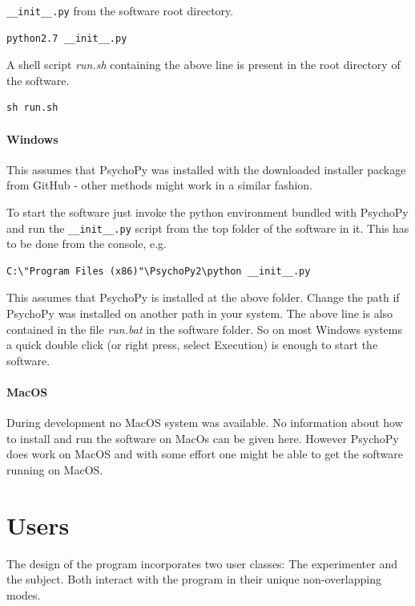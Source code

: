 \documentclass[12pt,a4paper]{book}
\begin{document}
\verb|__init__.py| from the software root directory.

\begin{verbatim}
python2.7 __init__.py
\end{verbatim}

A shell script \textit{run.sh} containing the above line is present in the root directory of the software.

\begin{verbatim}
sh run.sh
\end{verbatim}

\paragraph{Windows}

This assumes that PsychoPy was installed with the downloaded installer package from GitHub - other methods might work in a similar fashion.

To start the software just invoke the python environment bundled with PsychoPy and run the \verb|__init__.py| script from the top folder of the software in it. This has to be done from the console, e.g. 

\begin{verbatim}
C:\"Program Files (x86)"\PsychoPy2\python __init__.py
\end{verbatim}

This assumes that PsychoPy is installed at the above folder. Change the path if PsychoPy was installed on another path in your system. The above line is also contained in the file \textit{run.bat} in the software folder. So on most Windows systems a quick double click (or right press, select Execution) is enough to start the software.

\paragraph{MacOS}

During development no MacOS system was available. No information about how to install and run the software on MacOs can be given here. However PsychoPy does work on MacOS and with some effort one might be able to get the software running on MacOS.

\section{Users}

The design of the program incorporates two user classes: The experimenter and the subject. Both interact with the program in their unique non-overlapping modes.
\end{document}
